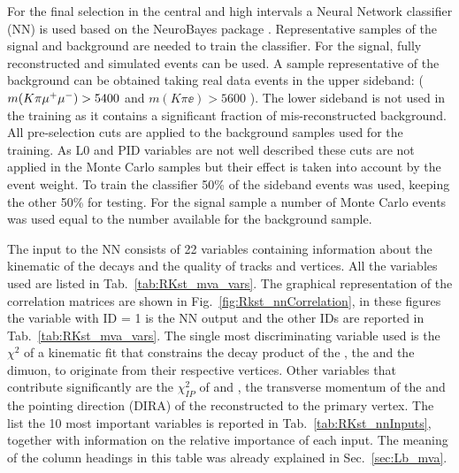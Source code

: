 For the final selection in the central and high \qsq intervals a Neural Network classifier (NN)
is used based on the NeuroBayes package \cite{Feindt:2006pm,feindt-2004}.
Representative samples of the signal and background are needed to train the classifier.
For the signal, fully reconstructed \BdToKstmm and \BdKstee simulated events can be used.
A sample representative of the background can be obtained taking real data events
in the upper \Bz sideband: ($m(K\pi\mumu) > 5400$ \mevcc and $m(K\pi\ee) > 5600$ \mevcc). The lower sideband is not
used in the training as it contains a significant fraction of mis-reconstructed background.
All pre-selection cuts are applied to the background samples used for the training.
As L0 and PID variables are not well described these cuts are not applied in the Monte Carlo
samples but their effect is taken into account by the event weight.
To train the classifier 50\% of the sideband events was used, keeping the other 50\% for testing.
For the signal sample a number of Monte Carlo events was used equal to the number available for
the background sample. 

The input to the NN consists of 22 variables containing information about the kinematic of the decays
and the quality of tracks and vertices. All the variables used are listed in Tab.~\ref{tab:RKst_mva_vars}.
The graphical representation of the correlation matrices are shown in Fig.~\ref{fig:Rkst_nnCorrelation},
in these figures the variable with ID = 1 is the NN output and the other IDs are reported in Tab.~\ref{tab:RKst_mva_vars}.
%
The single most discriminating variable used is the $\chi^2$ of a kinematic fit
that constrains the decay product of the \Bz, the \Kstar and the dimuon, to originate from their respective vertices.
Other variables that contribute significantly are the $\chi^2_{IP}$ of \jpsi and \Kstar, the transverse momentum
of the \Bz and the pointing direction (DIRA) of the reconstructed \Bz to the primary vertex.
The list the 10 most important variables is reported in Tab.~\ref{tab:RKst_nnInputs}, together
with information on the relative importance of each input. The meaning of the column headings
in this table was already explained in Sec.~\ref{sec:Lb_mva}.


